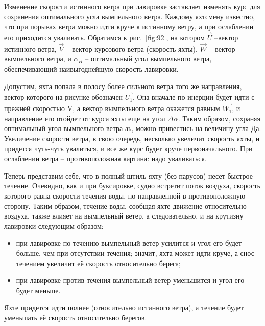 \documentclass[a4paper, 12pt, twoside, final]{scrbook}
\begin{document}
Изменение скорости истинного ветра при лавировке заставляет изменять курс для сохранения оптимального угла вымпельного ветра. Каждому яхтсмену известно, что при порывах ветра можно идти круче к истинному ветру, а при ослаблении его приходится уваливать. Обратимся к рис.~\ref{fig:92}, на котором $\overrightarrow{U}$ \---вектор истинного ветра, $\overrightarrow{V}$ \--- вектор курсового ветра (скорость яхты), $\overrightarrow{W}$ \--- вектор вымпельного ветра, и $\alpha_{B}$ \--- оптимальный угол вымпельного ветра, обеспечивающий наивыгоднейшую скорость лавировки.

Допустим, яхта попала в полосу более сильного ветра того же направления, вектор которого на рисунке обозначен $\overrightarrow{U_1}$. Она вначале по инерции будет идти с прежней скоростью V, а вектор вымпельного ветра окажется равным $\overrightarrow{W_1}$, и направление его отойдет от курса яхты еще на угол $\Delta\alpha$. Таким образом, сохраняя оптимальный угол вымпельного ветра аь, можно привестись на величину угла Да. Увеличение скорости ветра, в свою очередь, несколько увеличит скорость яхты, и придется чуть-чуть увалиться, и все же курс будет круче первоначального. При ослаблении ветра \--- противоположная картина: надо уваливаться.

Теперь представим себе, что в полный штиль яхту (без парусов) несет быстрое течение. Очевидно, как и при буксировке, судно встретит поток воздуха, скорость которого равна скорости течения воды, но направленной в противоположную сторону. Таким образом, течение воды, сообщая яхте движение относительно воздуха, также влияет на вымпельный ветер, а следовательно, и на крутизну лавировки следующим образом:

\begin{itemize}
\item при лавировке по течению вымпельный ветер усилится и угол его будет больше, чем при отсутствии течения;
значит, яхта может идти круче, а снос течением увеличит её скорость относительно берега;
\item при лавировке против течения вымпельный ветер уменьшится и угол его будет меньше. 
\end{itemize}

Яхте придется идти полнее (относительно истинного ветра), а течение будет уменьшать её скорость относительно берегов.
\end{document}
